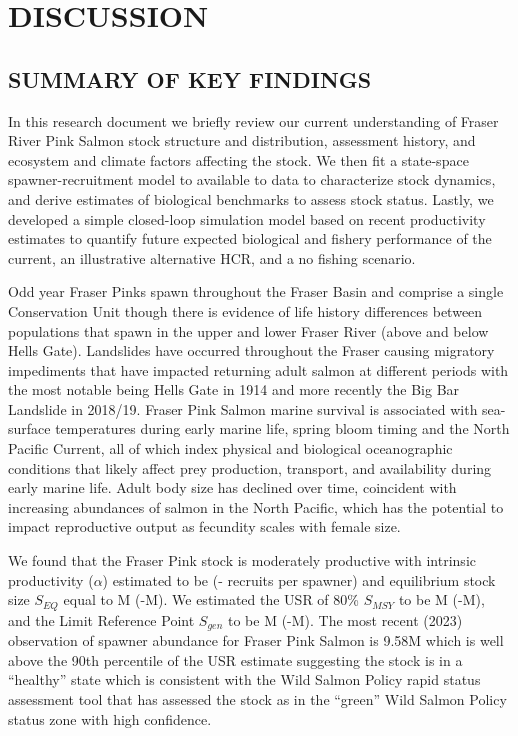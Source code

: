 \documentclass[french,11pt]{book}
\begin{document}
\hypertarget{discussion}{%
\section{DISCUSSION}\label{discussion}}

\hypertarget{summary-of-key-findings}{%
\subsection{SUMMARY OF KEY FINDINGS}\label{summary-of-key-findings}}

In this research document we briefly review our current understanding of Fraser River Pink Salmon stock structure and distribution, assessment history, and ecosystem and climate factors affecting the stock. We then fit a state-space spawner-recruitment model to available to data to characterize stock dynamics, and derive estimates of biological benchmarks to assess stock status. Lastly, we developed a simple closed-loop simulation model based on recent productivity estimates to quantify future expected biological and fishery performance of the current, an illustrative alternative HCR, and a no fishing scenario.

Odd year Fraser Pinks spawn throughout the Fraser Basin and comprise a single Conservation Unit though there is evidence of life history differences between populations that spawn in the upper and lower Fraser River (above and below Hells Gate). Landslides have occurred throughout the Fraser causing migratory impediments that have impacted returning adult salmon at different periods with the most notable being Hells Gate in 1914 and more recently the Big Bar Landslide in 2018/19. Fraser Pink Salmon marine survival is associated with sea-surface temperatures during early marine life, spring bloom timing and the North Pacific Current, all of which index physical and biological oceanographic conditions that likely affect prey production, transport, and availability during early marine life. Adult body size has declined over time, coincident with increasing abundances of salmon in the North Pacific, which has the potential to impact reproductive output as fecundity scales with female size.

We found that the Fraser Pink stock is moderately productive with intrinsic productivity (\(\alpha\)) estimated to be  (- recruits per spawner) and equilibrium stock size \(S_{EQ}\) equal to M (-M). We estimated the USR of 80\% \(S_{MSY}\) to be M (-M), and the Limit Reference Point \(S_{gen}\) to be M (-M). The most recent (2023) observation of spawner abundance for Fraser Pink Salmon is 9.58M which is well above the 90th percentile of the USR estimate suggesting the stock is in a ``healthy'' state which is consistent with the Wild Salmon Policy rapid status assessment tool that has assessed the stock as in the ``green'' Wild Salmon Policy status zone with high confidence.
\end{document}
